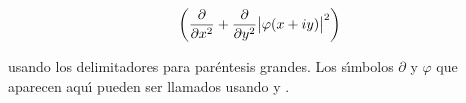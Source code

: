 

\bigskip


$$ \biggl({\partial \over \partial x^2} + {\partial \over \partial y^2}\bigl|\varphi(x + iy)\bigr|^2\biggr)  $$

\noindent usando los delimitadores \comando{\bigg} para par\'entesis grandes. Los s\'{\i}mbolos $\partial$ y 
$\varphi$ que aparecen aqu\'{\i} pueden ser llamados usando \comando{\partial} y \comando{\varphi}.

\bye
